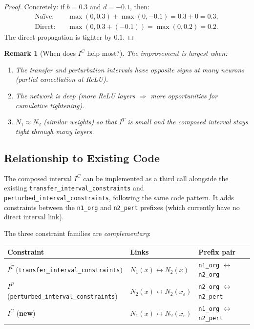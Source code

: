 \documentclass[11pt]{article}
\newtheorem{remark}{Remark}
\begin{document}
\begin{proof}
Concretely: if $b = 0.3$ and $d = -0.1$, then:
\begin{align*}
    \text{Na\"ive:} &\quad \max(0, 0.3) + \max(0, -0.1) = 0.3 + 0 = 0.3, \\
    \text{Direct:}  &\quad \max(0, 0.3 + (-0.1)) = \max(0, 0.2) = 0.2.
\end{align*}
The direct propagation is tighter by $0.1$.
\end{proof}

\begin{remark}[When does $I^C$ help most?]
The improvement is largest when:
\begin{enumerate}
    \item The transfer and perturbation intervals have \emph{opposite signs}
          at many neurons (partial cancellation at ReLU).
    \item The network is deep (more ReLU layers $\Rightarrow$ more opportunities
          for cumulative tightening).
    \item $N_1 \approx N_2$ (similar weights) so that $I^T$ is small and
          the composed interval stays tight through many layers.
\end{enumerate}
\end{remark}

\subsection{Relationship to Existing Code}
\label{sec:composed:code}

The composed interval $I^C$ can be implemented as a third call alongside the
existing \texttt{transfer\_interval\_constraints} and
\texttt{perturbed\_interval\_constraints}, following the same code pattern.
It adds constraints between the \texttt{n1\_org} and \texttt{n2\_pert} prefixes
(which currently have no direct interval link).

The three constraint families are \emph{complementary}:
\begin{center}
\renewcommand{\arraystretch}{1.3}
\begin{tabular}{l|l|l}
\textbf{Constraint} & \textbf{Links} & \textbf{Prefix pair} \\
\hline
$I^T$ (\texttt{transfer\_interval\_constraints})
    & $N_1(x) \leftrightarrow N_2(x)$ & \texttt{n1\_org} $\leftrightarrow$ \texttt{n2\_org} \\
$I^P$ (\texttt{perturbed\_interval\_constraints})
    & $N_2(x) \leftrightarrow N_2(x_\varepsilon)$ & \texttt{n2\_org} $\leftrightarrow$ \texttt{n2\_pert} \\
$I^C$ (\textbf{new})
    & $N_1(x) \leftrightarrow N_2(x_\varepsilon)$ & \texttt{n1\_org} $\leftrightarrow$ \texttt{n2\_pert} \\
\end{tabular}
\end{center}
\end{document}
